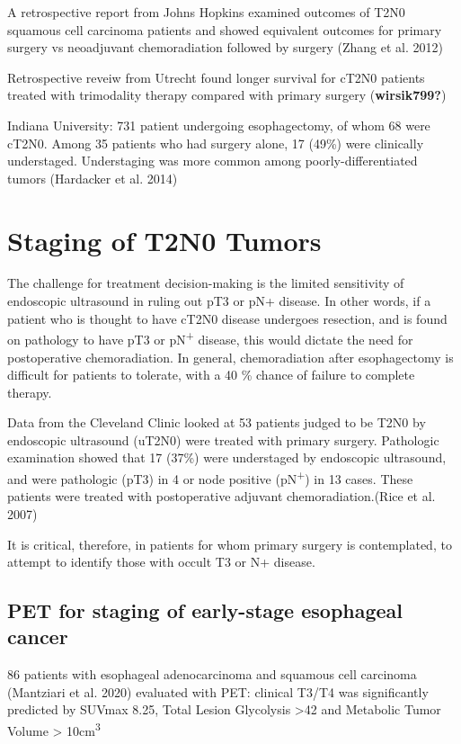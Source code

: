 \documentclass[
  letterpaper,
]{scrbook}
\begin{document}
A retrospective report from Johns Hopkins examined outcomes of T2N0
squamous cell carcinoma patients and showed equivalent outcomes for
primary surgery vs neoadjuvant chemoradiation followed by surgery (Zhang
et al. 2012)

Retrospective reveiw from Utrecht found longer survival for cT2N0
patients treated with trimodality therapy compared with primary surgery
(\textbf{wirsik799?})

Indiana University: 731 patient undergoing esophagectomy, of whom 68
were cT2N0. Among 35 patients who had surgery alone, 17 (49\%) were
clinically understaged. Understaging was more common among
poorly-differentiated tumors (Hardacker et al. 2014)

\section{Staging of T2N0 Tumors}\label{staging-of-t2n0-tumors}

The challenge for treatment decision-making is the limited sensitivity
of endoscopic ultrasound in ruling out pT3 or pN+ disease. In other
words, if a patient who is thought to have cT2N0 disease undergoes
resection, and is found on pathology to have pT3 or
pN\textsuperscript{+} disease, this would dictate the need for
postoperative chemoradiation. In general, chemoradiation after
esophagectomy is difficult for patients to tolerate, with a 40 \% chance
of failure to complete therapy.

Data from the Cleveland Clinic looked at 53 patients judged to be T2N0
by endoscopic ultrasound (uT2N0) were treated with primary surgery.
Pathologic examination showed that 17 (37\%) were understaged by
endoscopic ultrasound, and were pathologic (pT3) in 4 or node positive
(pN\textsuperscript{+}) in 13 cases. These patients were treated with
postoperative adjuvant chemoradiation.(Rice et al. 2007)

It is critical, therefore, in patients for whom primary surgery is
contemplated, to attempt to identify those with occult T3 or N+ disease.

\subsection{PET for staging of early-stage esophageal
cancer}\label{pet-for-staging-of-early-stage-esophageal-cancer}

86 patients with esophageal adenocarcinoma and squamous cell carcinoma
(Mantziari et al. 2020) evaluated with PET: clinical T3/T4 was
significantly predicted by SUVmax 8.25, Total Lesion Glycolysis
\textgreater42 and Metabolic Tumor Volume \textgreater{}
10cm\textsuperscript{3}
\end{document}
